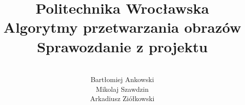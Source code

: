 \documentclass[a4paper,12pt]{article}
\title{\Huge \textbf{Politechnika Wrocławska\\[0.3in]} 
  \huge Algorytmy przetwarzania obrazów \\[0.2in]
  \LARGE Sprawozdanie z projektu
}
\date{}
\author{
 	\quad	\\
  Bartłomiej Ankowski\\
  Mikolaj Szawdzin\\
  Arkadiusz Ziółkowski\\
}
\begin{document}
\maketitle
\pagebreak

\tableofcontents
\pagebreak





\end{document}
